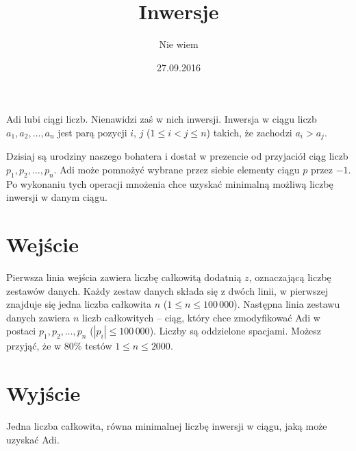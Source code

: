 \documentclass[zad,zawodnik,utf8]{sinol}
\title{Inwersje}
\author{Nie wiem} %
\date{27.09.2016}
\begin{document}
\begin{tasktext}%
Adi lubi ciągi liczb. Nienawidzi zaś w nich inwersji. Inwersja w ciągu liczb $a_1, a_2, \dots, a_n$ jest parą pozycji $i$, $j$ ($1 \leq i < j \leq n$) takich,
że zachodzi $a_i > a_j$.

Dzisiaj są urodziny naszego bohatera i dostał w prezencie od przyjaciół ciąg liczb $p_1, p_2, \dots, p_n$. Adi może pomnożyć wybrane
przez siebie elementy ciągu $p$ przez $-1$. Po wykonaniu tych operacji mnożenia chce uzyskać minimalną możliwą liczbę inwersji w danym ciągu.

  \section{Wejście}
Pierwsza linia wejścia zawiera liczbę całkowitą dodatnią $z$, oznaczającą liczbę zestawów danych. Każdy zestaw danych składa się z dwóch linii,
w pierwszej znajduje się jedna liczba całkowita $n$ ($1 \leq n \leq 100\,000$). Następna linia zestawu danych zawiera $n$ liczb całkowitych -- ciąg,
który chce zmodyfikować Adi w postaci $p_1, p_2, \dots, p_n$ ($|p_i| \leq 100\,000$). Liczby są oddzielone spacjami. Możesz przyjąć, że w $80\%$ testów
$1 \leq n \leq 2000$.
  \section{Wyjście}
Jedna liczba całkowita, równa minimalnej liczbę inwersji w ciągu, jaką może uzyskać Adi.
\makecompactexample

\end{tasktext}
\end{document}
